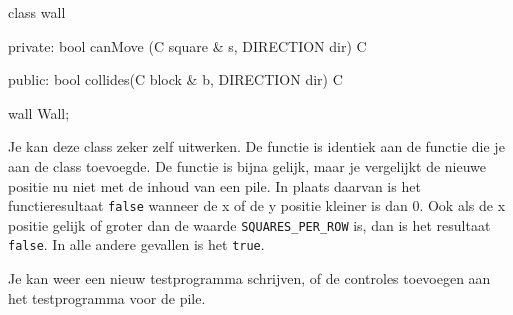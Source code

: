 \begin{code}
class wall
{
private:
   bool canMove (C square & s, DIRECTION dir) C {}
   
public:  
   bool collides(C block  & b, DIRECTION dir) C {}
}

wall Wall;
\end{code}

Je kan deze class zeker zelf uitwerken. De functie  is identiek aan de functie die je aan de class  toevoegde. De functie  is bijna gelijk, maar je vergelijkt de nieuwe positie nu niet met de inhoud van een pile. In plaats daarvan is het functieresultaat \verb|false| wanneer de x of de y positie kleiner is dan 0. Ook als de x positie gelijk of groter dan de waarde \verb|SQUARES_PER_ROW| is, dan is het resultaat \verb|false|. In alle andere gevallen is het \verb|true|.

Je kan weer een nieuw testprogramma schrijven, of de controles toevoegen aan het testprogramma voor de pile.